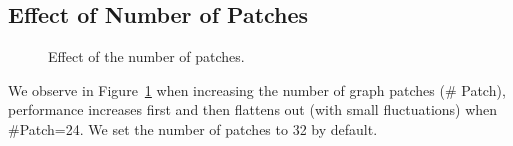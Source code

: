 \documentclass{article}
\begin{document}
\subsection{Effect of Number of Patches}


\begin{figure}[!ht]
\centering     %
{}
\hspace{8mm}
\caption{Effect of the number of patches.}
\label{fig: num patch}
\end{figure}

We observe in Figure~\ref{fig: num patch} when increasing the number of graph patches (\# Patch), performance increases first and then flattens out (with small fluctuations) when \#Patch=24. We set the number of patches to 32 by default.
\end{document}
